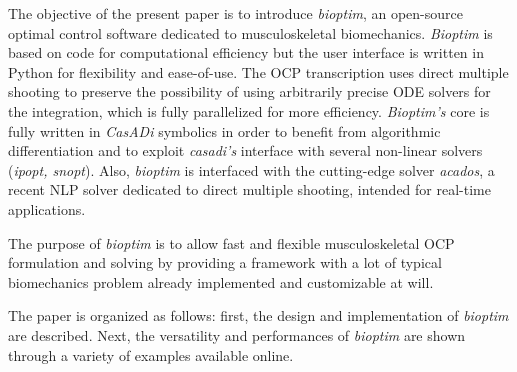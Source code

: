 The objective of the present paper is to introduce \textit{bioptim}, an open-source optimal control software dedicated to musculoskeletal biomechanics.
\textit{Bioptim} is based on  code for computational efficiency but the user interface is written in Python for flexibility and ease-of-use. 
The OCP transcription uses direct multiple shooting to preserve the possibility of using arbitrarily precise ODE solvers for the integration, which is fully parallelized for more efficiency.
\textit{Bioptim's} core is fully written in \textit{CasADi} symbolics in order to benefit from algorithmic differentiation and to exploit \textit{casadi's} interface with several non-linear solvers (\textit{ipopt, snopt}).
Also, \textit{bioptim} is interfaced with the cutting-edge solver \textit{acados}, a recent NLP solver dedicated to direct multiple shooting, intended for real-time applications.

The purpose of \textit{bioptim} is to allow fast and flexible musculoskeletal OCP formulation and solving by providing a framework with a lot of typical biomechanics problem already implemented and customizable at will.

The paper is organized as follows: first, the design and implementation of \textit{bioptim} are described.
Next, the versatility and performances of \textit{bioptim} are shown through a variety of examples available online. 
